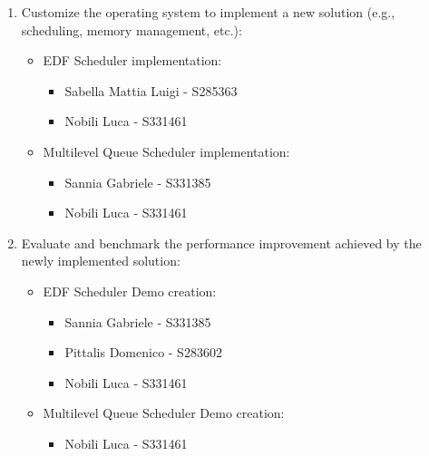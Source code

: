 \documentclass{article}
\begin{document}
\begin{enumerate}
    \item Customize the operating system to implement a new solution (e.g., scheduling, memory management, etc.):
    \begin{itemize}
        \item EDF Scheduler implementation:
        \begin{itemize}
            \item Sabella Mattia Luigi - S285363
            \item Nobili Luca - S331461
        \end{itemize}

        \item Multilevel Queue Scheduler implementation:
        \begin{itemize}
            \item Sannia Gabriele - S331385
            \item Nobili Luca - S331461
        \end{itemize}
    \end{itemize}

    \item Evaluate and benchmark the performance improvement achieved by the newly implemented solution:
    \begin{itemize}
        \item EDF Scheduler Demo creation:
        \begin{itemize}
            \item Sannia Gabriele - S331385
            \item Pittalis Domenico - S283602
            \item Nobili Luca - S331461
        \end{itemize}

        \item Multilevel Queue Scheduler Demo creation:
        \begin{itemize}
            \item Nobili Luca - S331461
        \end{itemize}
    \end{itemize}
\end{enumerate}
\end{document}
